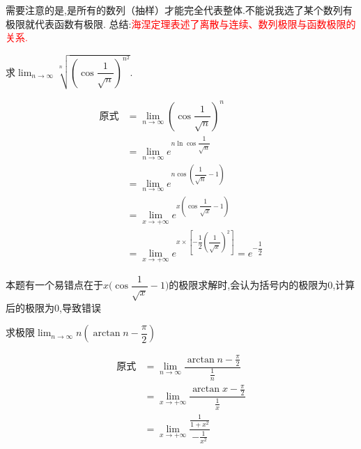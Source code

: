 \documentclass[8pt a4paper, oneside, UTF8]{ctexbook}
\begin{document}
\begin{sloppypar}
\begin{center}
    \end{center}
    需要注意的是,是所有的数列（抽样）才能完全代表整体.不能说我选了某个数列有极限就代表函数有极限.
    总结:\textcolor{red}{海涅定理表述了离散与连续、数列极限与函数极限的关系.}
    \begin{problem}
    求$\lim_{n\to\infty}\sqrt[n]{\left(\cos\dfrac1{\sqrt{n}}\right)^{n^2}}.$
    \end{problem}
    \begin{solution}
        \begin{align*}
            \text{原式} & = \lim_{n\to \infty} \left( \cos\dfrac{1}{\sqrt{n}} \right)^n                                           \\
                      & = \lim_{n\to \infty} e^{n \ln \cos \dfrac{1}{\sqrt{n}}}                                                 \\
                      & = \lim_{n\to \infty} e^{n \cos \left(\dfrac{1}{\sqrt{n}} - 1 \right)}                                   \\
                      & = \lim_{x\to+\infty}e^{x \left(\cos\dfrac{1}{\sqrt{x}}-1\right)}                                        \\
                      & = \lim_{x\to+\infty}e^{x \times \left[-\dfrac12{\left(\dfrac1{\sqrt{x}}\right)}^2\right]}=e^{-\dfrac12}
        \end{align*}
    \end{solution}
    \begin{note}
        本题有一个易错点在于$x\Bigg(\cos\dfrac{1}{\sqrt{x}}-1\Bigg)$的极限求解时,会认为括号内的极限为0,计算后的极限为0,导致错误
    \end{note}
    \begin{problem}
    求极限$\lim_{n \to \infty}n(\arctan n -\dfrac{\pi}{2})$
    \end{problem}
    \begin{solution}
        \begin{align*}
            \text{原式} & = \lim_{n \to \infty}\dfrac{\arctan n-\frac{\pi}{2}}{\frac{1}{n}}    \\
                      & =  \lim_{x \to +\infty}\dfrac{\arctan x -\frac{\pi}{2}}{\frac{1}{x}} \\
                      & = \lim_{x\to+\infty}\dfrac{\frac1{1+x^2}}{-\frac1{x^2}}              \\

\end{align*}
\end{solution}
\end{sloppypar}
\end{document}
